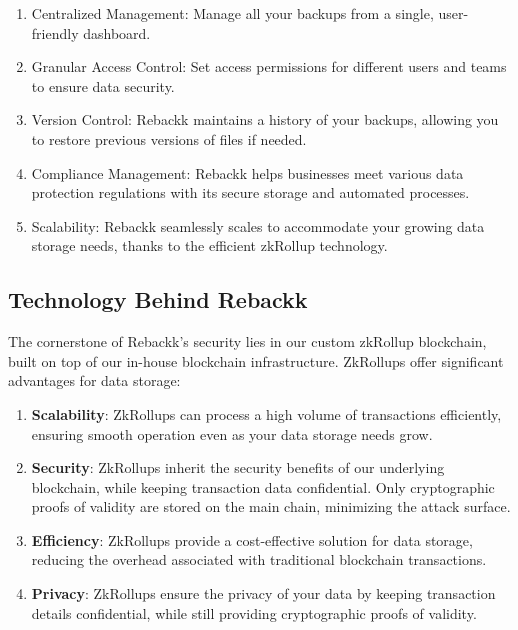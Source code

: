 \documentclass[12pt]{article}
\begin{document}
\begin{enumerate}
    \item \textcolor{black}{\bfseries}Centralized Management\textcolor{black}{\normalfont}: Manage all your backups from a single, user-friendly dashboard.
    \item \textcolor{black}{\bfseries}Granular Access Control\textcolor{black}{\normalfont}: Set access permissions for different users and teams to ensure data security.
    \item \textcolor{black}{\bfseries}Version Control\textcolor{black}{\normalfont}: Rebackk maintains a history of your backups, allowing you to restore previous versions of files if needed.
    \item \textcolor{black}{\bfseries}Compliance Management\textcolor{black}{\normalfont}: Rebackk helps businesses meet various data protection regulations with its secure storage and automated processes.
    \item \textcolor{black}{\bfseries}Scalability\textcolor{black}{\normalfont}: Rebackk seamlessly scales to accommodate your growing data storage needs, thanks to the efficient zkRollup technology.
\end{enumerate}

\subsection{Technology Behind Rebackk}

The cornerstone of Rebackk's security lies in our custom zkRollup blockchain, built on top of our in-house blockchain infrastructure. ZkRollups offer significant advantages for data storage:
\begin{enumerate}
    \item \textbf{Scalability}: ZkRollups can process a high volume of transactions efficiently, ensuring smooth operation even as your data storage needs grow.
    \item \textbf{Security}: ZkRollups inherit the security benefits of our underlying blockchain, while keeping transaction data confidential. Only cryptographic proofs of validity are stored on the main chain, minimizing the attack surface.
    \item \textbf{Efficiency}: ZkRollups provide a cost-effective solution for data storage, reducing the overhead associated with traditional blockchain transactions.
    \item \textbf{Privacy}: ZkRollups ensure the privacy of your data by keeping transaction details confidential, while still providing cryptographic proofs of validity.
\end{enumerate}
\end{document}
